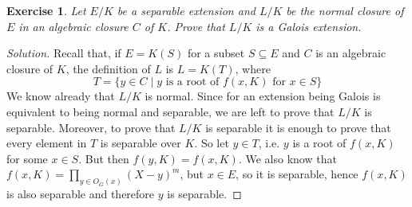\documentclass[a4paper,10pt,reqno]{amsart}
\newtheorem{ex}{Exercise}[section]
\newenvironment{sol}
  {\renewcommand\qedsymbol{$\blacksquare$}\begin{proof}[Solution]}
  {\end{proof}}
\begin{document}
\begin{ex}
\label{7.2}
    Let $E/K$ be a separable extension and $L/K$ be the normal closure of $E$ in an algebraic closure $C$ of $K$.
    Prove that $L/K$ is a Galois extension.
\end{ex}
\begin{sol}
Recall that, if $E=K(S)$ for a subset $S\subseteq E$ and $C$ is an algebraic closure of $K$,
the definition of $L$
is $L=K(T)$,
where 
$$T=\{y\in C\mid y\text{ is a root of }f(x,K) \text{ for }x\in S\}$$
We know already that $L/K$ is normal.
    Since for an extension being Galois is equivalent to being normal and separable, we are left to prove that $L/K$ is separable.
Moreover, to prove that $L/K$ is separable it is enough to prove that 
every element in $T$ is separable over $K$.
So let $y\in T$, i.e. $y$ is a root of $f(x,K)$
for some $x\in S$.
But then $f(y,K)=f(x,K)$.
We also know that 
$f(x,K)=\prod_{y\in O_G(x)}(X-y)^m$,
but $x\in E$, so it is separable, hence $f(x,K)$ is also separable and therefore $y$ is separable.    
\end{sol}
\end{document}

